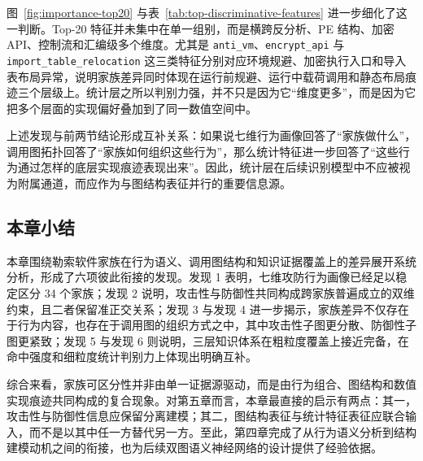 图~\ref{fig:importance-top20} 与表~\ref{tab:top-discriminative-features} 进一步细化了这一判断。Top-20 特征并未集中在单一组别，而是横跨反分析、PE 结构、加密 API、控制流和汇编级多个维度。尤其是 \texttt{anti\_vm}、\texttt{encrypt\_api} 与 \texttt{import\_table\_relocation} 这三类特征分别对应环境规避、加密执行入口和导入表布局异常，说明家族差异同时体现在运行前规避、运行中载荷调用和静态布局痕迹三个层级上。统计层之所以判别力强，并不只是因为它“维度更多”，而是因为它把多个层面的实现偏好叠加到了同一数值空间中。

上述发现与前两节结论形成互补关系：如果说七维行为画像回答了“家族做什么”，调用图拓扑回答了“家族如何组织这些行为”，那么统计特征进一步回答了“这些行为通过怎样的底层实现痕迹表现出来”。因此，统计层在后续识别模型中不应被视为附属通道，而应作为与图结构表征并行的重要信息源。

\subsection{本章小结}

本章围绕勒索软件家族在行为语义、调用图结构和知识证据覆盖上的差异展开系统分析，形成了六项彼此衔接的发现。发现 1 表明，七维攻防行为画像已经足以稳定区分 34 个家族；发现 2 说明，攻击性与防御性共同构成跨家族普遍成立的双维约束，且二者保留准正交关系；发现 3 与发现 4 进一步揭示，家族差异不仅存在于行为内容，也存在于调用图的组织方式之中，其中攻击性子图更分散、防御性子图更紧致；发现 5 与发现 6 则说明，三层知识体系在粗粒度覆盖上接近完备，在命中强度和细粒度统计判别力上体现出明确互补。

综合来看，家族可区分性并非由单一证据源驱动，而是由行为组合、图结构和数值实现痕迹共同构成的复合现象。对第五章而言，本章最直接的启示有两点：其一，攻击性与防御性信息应保留分离建模；其二，图结构表征与统计特征表征应联合输入，而不是以其中任一方替代另一方。至此，第四章完成了从行为语义分析到结构建模动机之间的衔接，也为后续双图语义神经网络的设计提供了经验依据。